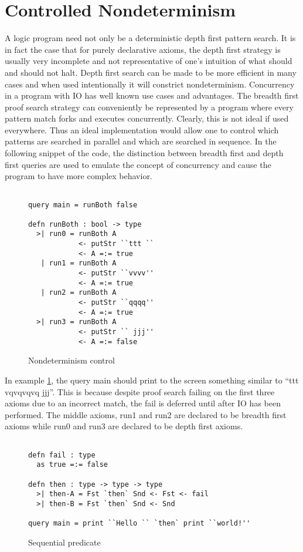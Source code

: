 \section{Controlled Nondeterminism}

A logic program need not only be a deterministic depth first pattern search. It is in fact
the case that for purely declarative axioms, the depth first strategy is usually very incomplete
and not representative of one’s intuition of what should and should not halt.
Depth first search can be made to be more efficient in many cases and when used intentionally
it will constrict nondeterminism. Concurrency in a program with IO has
well known use cases and advantages. The breadth first proof search strategy can conveniently
be represented by a program where every pattern match forks and executes
concurrently. Clearly, this is not ideal if used everywhere. Thus an ideal implementation
would allow one to control which patterns are searched in parallel and which
are searched in sequence. In the following snippet of the code, the distinction between
breadth first and depth first queries are used to emulate the concept of concurrency and
cause the program to have more complex behavior.

\begin{figure}[H]
\begin{lstlisting}

query main = runBoth false

defn runBoth : bool -> type
  >| run0 = runBoth A
            <- putStr ``ttt ``
            <- A =:= true
   | run1 = runBoth A 
            <- putStr ``vvvv''
            <- A =:= true
   | run2 = runBoth A
            <- putStr ``qqqq''
            <- A =:= true
  >| run3 = runBoth A
            <- putStr `` jjj''
            <- A =:= false

\end{lstlisting}
\caption{Nondeterminism control}
\label{nondet:ex1}
\end{figure}

In example \ref{nondet:ex1}, the query main should print to the screen something similar to “ttt
vqvqvqvq jjj”. This is because despite proof search failing on the first three axioms due
to an incorrect match, the fail is deferred until after IO has been performed. The middle
axioms, run1 and run2 are declared to be breadth first axioms while run0 and run3 are
declared to be depth first axioms.


\begin{figure}[H]
\begin{lstlisting}

defn fail : type
  as true =:= false

defn then : type -> type -> type
  >| then-A = Fst `then` Snd <- Fst <- fail
  >| then-B = Fst `then` Snd <- Snd

query main = print ``Hello `` `then` print ``world!''

\end{lstlisting}
\caption{Sequential predicate}
\label{nondet:seq}
\end{figure}

